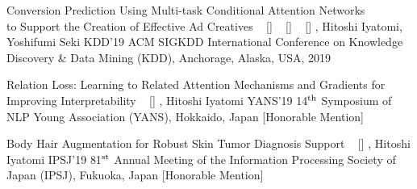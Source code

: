 \begin{publications}
    \icpublication
    {Conversion Prediction Using Multi-task Conditional Attention Networks \\ to Support the Creation of Effective Ad Creatives}
    {
    ~ [\href{https://doi.org/10.1145/3292500.3330789}{\small{\doiSymbol}}]
    ~ [\href{https://arxiv.org/abs/1905.07289}{\small{\arxivSymbol}}]
    ~ [\href{https://github.com/shunk031/Multi-task-Conditional-Attention-Networks}{\small{\githubSymbol}}]
    }
    {\underline{}, Hitoshi Iyatomi, Yoshifumi Seki}
    {KDD'19} {ACM SIGKDD International Conference on Knowledge Discovery \& Data Mining (KDD), Anchorage, Alaska, USA, 2019}




    \dcpublication
    {Relation Loss: Learning to Related Attention Mechanisms and Gradients for Improving Interpretability}
    {
    ~ [\href{https://www.hosei.ac.jp/gs/NEWS/zaigaku/koganei/20190920/}{\small{\linkSymbol}}]
    }
    {\underline{}, Hitoshi Iyatomi}
    {YANS'19} {14$^{\textrm{\scriptsize th}}$ Symposium of NLP Young Association (YANS), Hokkaido, Japan [Honorable Mention]}

    \dcpublication
    {Body Hair Augmentation for Robust Skin Tumor Diagnosis Support}
    {
    ~ [\href{https://www.hosei.ac.jp/gs/NEWS/topics/jusho/190411_4/}{\small{\linkSymbol}}]
    }
    {\underline{}, Hitoshi Iyatomi}
    {IPSJ'19} {81$^{\textrm{\scriptsize st}}$ Annual Meeting of the Information Processing Society of Japan (IPSJ), Fukuoka, Japan [Honorable Mention]}

\end{publications}
